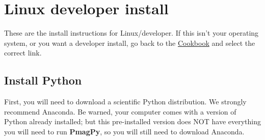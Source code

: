 \documentclass[11pt]{article}
\begin{document}
\tableofcontents

\section{Linux developer install}

These are the install instructions for Linux/developer.  If this isn't your operating system, or you want a developer install, go back to the \href{https://earthref.org/PmagPy/cookbook/#next_steps}{Cookbook} and select the correct link.

\subsection{Install Python}

First, you will need to download a scientific Python distribution.  We strongly recommend Anaconda.  Be warned, your computer comes with a version of Python already installed; but this pre-installed version does NOT have everything you will need to run {\bf PmagPy}, so you will still need to download Anaconda.
\end{document}
